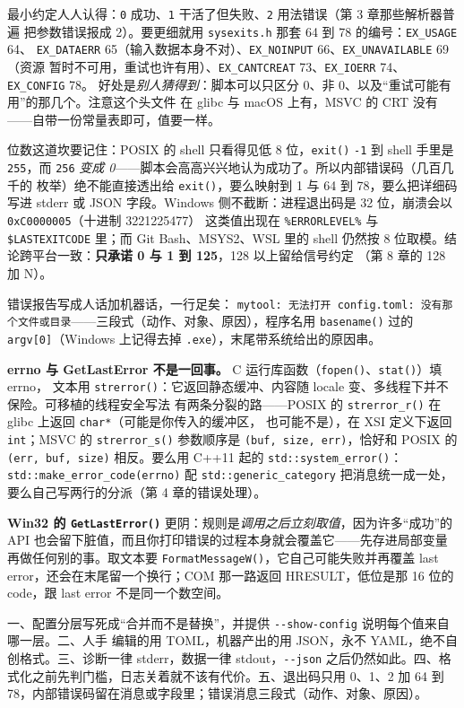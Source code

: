 \documentclass[12pt,a4paper,fontset=fandol]{ctexbook}
\newcommand{\cpp}[1]{C++#1}
\newcommand{\Fn}[1]{\texttt{#1()}}
\newcommand{\Tp}[1]{\texttt{#1}}
\newcommand{\Opt}[1]{\texttt{-\/-#1}}
\begin{document}
最小约定人人认得：\Tp{0} 成功、\Tp{1} 干活了但失败、\Tp{2} 用法错误（第 3 章那些解析器普遍
把参数错误报成 2）。要更细就用 \Tp{sysexits.h} 那套 64 到 78 的编号：\Tp{EX\_USAGE} 64、
\Tp{EX\_DATAERR} 65（输入数据本身不对）、\Tp{EX\_NOINPUT} 66、\Tp{EX\_UNAVAILABLE} 69（资源
暂时不可用，重试也许有用）、\Tp{EX\_CANTCREAT} 73、\Tp{EX\_IOERR} 74、\Tp{EX\_CONFIG} 78。
好处是\emph{别人猜得到}：脚本可以只区分 0、非 0、以及``重试可能有用''的那几个。注意这个头文件
在 glibc 与 macOS 上有，MSVC 的 CRT 没有——自带一份常量表即可，值要一样。

位数这道坎要记住：POSIX 的 shell 只看得见低 8 位，\Fn{exit} \Tp{-1} 到 shell 手里是
\Tp{255}，而 \Tp{256} \emph{变成 0}——脚本会高高兴兴地认为成功了。所以内部错误码（几百几千的
枚举）绝不能直接透出给 \Fn{exit}，要么映射到 1 与 64 到 78，要么把详细码写进 stderr 或 JSON
字段。Windows 侧不截断：进程退出码是 32 位，崩溃会以 \Tp{0xC0000005}（十进制 3221225477）
这类值出现在 \Tp{\%ERRORLEVEL\%} 与 \Tp{\$LASTEXITCODE} 里；而 Git Bash、MSYS2、WSL 里的
shell 仍然按 8 位取模。结论跨平台一致：\textbf{只承诺 0 与 1 到 125}，128 以上留给信号约定
（第 8 章的 128 加 N）。

错误报告写成人话加机器话，一行足矣：
\Tp{mytool: 无法打开 config.toml: 没有那个文件或目录}——三段式（动作、对象、原因），程序名用
\Fn{basename} 过的 \Tp{argv[0]}（Windows 上记得去掉 \Tp{.exe}），末尾带系统给出的原因串。

\textbf{errno 与 GetLastError 不是一回事。} C 运行库函数（\Fn{fopen}、\Fn{stat}）填 errno，
文本用 \Fn{strerror}：它返回静态缓冲、内容随 locale 变、多线程下并不保险。可移植的线程安全写法
有两条分裂的路——POSIX 的 \Fn{strerror\_r} 在 glibc 上返回 \Tp{char*}（可能是你传入的缓冲区，
也可能不是），在 XSI 定义下返回 \Tp{int}；MSVC 的 \Fn{strerror\_s} 参数顺序是
\Tp{(buf, size, err)}，恰好和 POSIX 的 \Tp{(err, buf, size)} 相反。要么用 \cpp{11} 起的
\Fn{std::system\_error}：\Tp{std::make\_error\_code(errno)} 配 \Tp{std::generic\_category}
把消息统一成一处，要么自己写两行的分派（第 4 章的错误处理）。

\textbf{Win32 的 \Fn{GetLastError}} 更阴：规则是\emph{调用之后立刻取值}，因为许多``成功''的
API 也会留下脏值，而且你打印错误的过程本身就会覆盖它——先存进局部变量再做任何别的事。取文本要
\Fn{FormatMessageW}，它自己可能失败并再覆盖 last error，还会在末尾留一个换行；COM 那一路返回
HRESULT，低位是那 16 位的 code，跟 last error 不是同一个数空间。

\begin{bestpractice}[title={配置、日志与退出码的五条纪律}]
一、配置分层写死成``合并而不是替换''，并提供 \Opt{show-config} 说明每个值来自哪一层。二、人手
编辑的用 TOML，机器产出的用 JSON，永不 YAML，绝不自创格式。三、诊断一律 stderr，数据一律
stdout，\Opt{json} 之后仍然如此。四、格式化之前先判门槛，日志关着就不该有代价。五、退出码只用
0、1、2 加 64 到 78，内部错误码留在消息或字段里；错误消息三段式（动作、对象、原因）。
\end{bestpractice}
\end{document}

